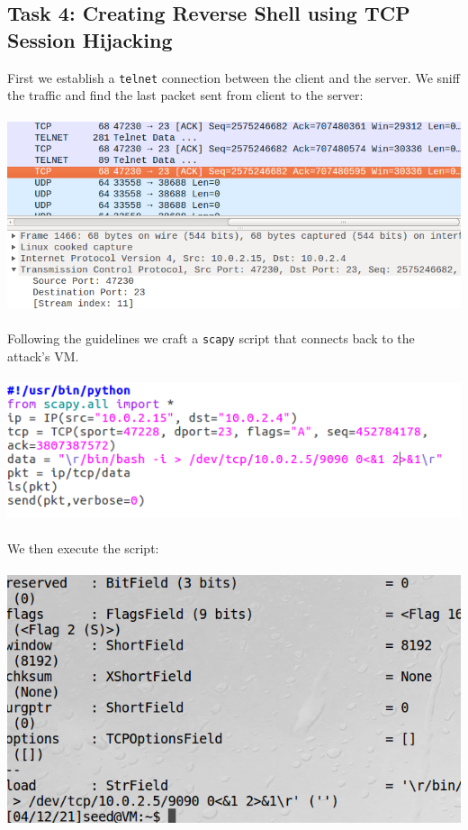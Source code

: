 \documentclass[a4paper]{article}
\begin{document}
\subsection{Task 4: Creating Reverse Shell using TCP Session Hijacking}
First we establish a \verb+telnet+ connection between the client and the server. We sniff the traffic and find the last packet sent from client to the server:\\\\
\includegraphics[scale=0.7]{1/33.png}\\\\
Following the guidelines we craft a \verb+scapy+ script that connects back to the attack's VM.\\\\
\includegraphics[scale=0.7]{1/34.png}\\\\
We then execute the script:\\\\
\includegraphics[scale=0.7]{1/35.png}\\\\
\end{document}
